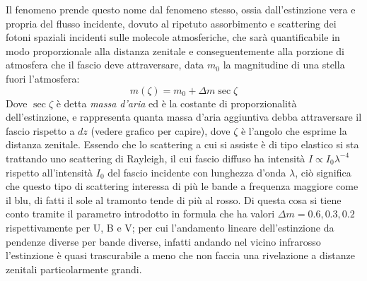 \documentclass[a4paper,twoside,openany,notitlepage]{book}
\theoremstyle{definition}
\theoremstyle{plain}
\begin{document}
Il fenomeno prende questo nome dal fenomeno stesso, ossia dall'estinzione vera e propria del flusso incidente, dovuto al ripetuto assorbimento e scattering dei fotoni spaziali incidenti sulle molecole atmosferiche, che sarà quantificabile in modo proporzionale alla distanza zenitale e conseguentemente alla porzione di atmosfera che il fascio deve attraversare, data $m_0$ la magnitudine di una stella fuori l'atmosfera:
\begin{equation*}
	m(\zeta) = m_0 + \Delta m \sec \zeta
\end{equation*}
Dove $\sec\zeta$ è detta \textit{massa d'aria} ed è la costante di proporzionalità dell'estinzione, e rappresenta quanta massa d'aria aggiuntiva debba attraversare il fascio rispetto a $dz$ (vedere grafico per capire), dove $\zeta$ è l'angolo che esprime la distanza zenitale. Essendo che lo scattering a cui si assiste è di tipo elastico si sta trattando uno scattering di Rayleigh, il cui fascio diffuso ha intensità $I \propto I_0 \lambda^{-4}$ rispetto all'intensità $I_0$ del fascio incidente con lunghezza d'onda $\lambda$, ciò significa che questo tipo di scattering interessa di più le bande a frequenza maggiore come il blu, di fatti il sole al tramonto tende di più al rosso. Di questa cosa si tiene conto tramite il parametro introdotto in formula che ha valori $\Delta m = 0.6, 0.3, 0.2$ rispettivamente per U, B e V; per cui l'andamento lineare dell'estinzione da pendenze diverse per bande diverse, infatti andando nel vicino infrarosso l'estinzione è quasi trascurabile a meno che non faccia una rivelazione a distanze zenitali particolarmente grandi.
\end{document}
